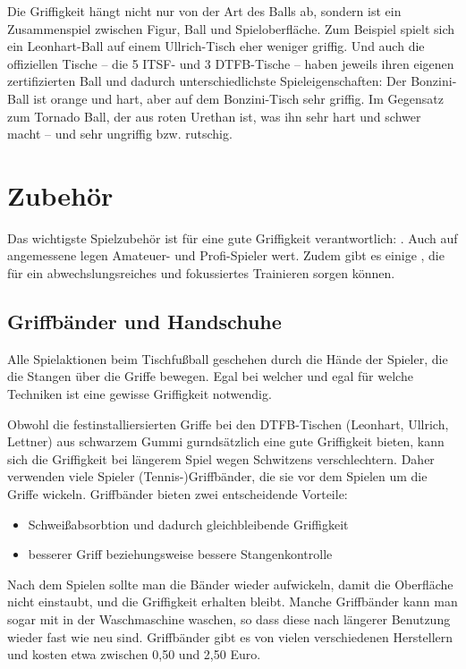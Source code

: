Die Griffigkeit hängt nicht nur von der Art des Balls ab, sondern ist ein Zusammenspiel zwischen Figur, Ball und Spieloberfläche. 
Zum Beispiel spielt sich ein Leonhart-Ball auf einem Ullrich-Tisch eher weniger griffig.  
Und auch die offiziellen Tische -- die 5 ITSF- und 3 DTFB-Tische -- haben jeweils ihren eigenen zertifizierten Ball und dadurch unterschiedlichste Spieleigenschaften:
Der Bonzini-Ball ist orange und hart, aber auf dem Bonzini-Tisch sehr griffig. 
Im Gegensatz zum Tornado Ball, der aus roten Urethan ist, was ihn sehr hart und schwer macht -- und sehr ungriffig bzw. rutschig. 



\section{Zubehör}
\label{tisch:zubehoer}

Das wichtigste Spielzubehör ist für eine gute Griffigkeit verantwortlich: .
Auch auf angemessene  legen Amateuer- und Profi-Spieler wert.
Zudem gibt es einige , die für ein abwechslungsreiches und fokussiertes Trainieren sorgen können.

\subsection{Griffbänder und Handschuhe}
\label{tisch:zubehoer:griffe}

Alle Spielaktionen beim Tischfußball geschehen durch die Hände der Spieler, die die Stangen über die Griffe bewegen.
Egal bei welcher  und egal für welche Techniken ist eine gewisse Griffigkeit notwendig. 

Obwohl die festinstalliersierten Griffe bei den DTFB-Tischen (Leonhart, Ullrich, Lettner) aus schwarzem Gummi gurndsätzlich eine gute Griffigkeit bieten, kann sich die Griffigkeit bei längerem Spiel wegen Schwitzens verschlechtern.
Daher verwenden viele Spieler (Tennis-)Griffbänder, die sie vor dem Spielen um die Griffe wickeln. 
Griffbänder bieten zwei entscheidende Vorteile:
\begin{itemize}
\item Schweißabsorbtion und dadurch gleichbleibende Griffigkeit
\item besserer Griff beziehungsweise bessere Stangenkontrolle
\end{itemize}
Nach dem Spielen sollte man die Bänder wieder aufwickeln, damit die Oberfläche nicht einstaubt, und die Griffigkeit erhalten bleibt.
Manche Griffbänder kann man sogar mit in der Waschmaschine waschen, so dass diese nach längerer Benutzung wieder fast  wie neu sind. 
Griffbänder gibt es von vielen verschiedenen Herstellern und kosten etwa zwischen 0,50 und 2,50 Euro. 

